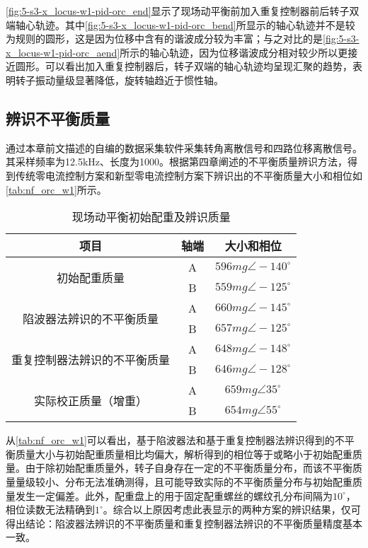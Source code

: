 \documentclass[
  lang=cn,
  degree=master,
  openany,oneside
]{nuaathesis}
\begin{document}
\autoref{fig:5-s3-x_locus-w1-pid-orc_end}显示了现场动平衡前加入重复控制器前后转子双端轴心轨迹。其中\autoref{fig:5-s3-x_locus-w1-pid-orc_bend}所显示的轴心轨迹并不是较为规则的圆形，这是因为位移中含有的谐波成分较为丰富；与之对比的是\autoref{fig:5-s3-x_locus-w1-pid-orc_aend}所示的轴心轨迹，因为位移谐波成分相对较少所以更接近圆形。可以看出加入重复控制器后，转子双端的轴心轨迹均呈现汇聚的趋势，表明转子振动量级显著降低，旋转轴趋近于惯性轴。

\subsection{辨识不平衡质量}

通过本章前文描述的自编的数据采集软件采集转角离散信号和四路位移离散信号。其采样频率为12.5kHz、长度为1000。根据第四章阐述的不平衡质量辨识方法，得到传统零电流控制方案和新型零电流控制方案下辨识出的不平衡质量大小和相位如\autoref{tab:nf_orc_w1}所示。

\begin{table}[h!]
  \caption[现场动平衡初始配重及辨识质量]{现场动平衡初始配重及辨识质量\label{tab:nf_orc_w1}}
\begin{tabular}{ccc}
    \toprule
    	项目  & 轴端 & 大小和相位 \\
    \midrule
		\multirow{2}{*}{初始配重质量}   
		& A  & $596mg \angle -140^{\circ}$      \\
		& B  & $559mg \angle -125^{\circ}$      \\    
		\multirow{2}{*}{陷波器法辨识的不平衡质量}   
		& A  & $660mg \angle -145^{\circ}$      \\
		& B  & $657mg \angle -125^{\circ}$      \\
		\multirow{2}{*}{重复控制器法辨识的不平衡质量} 
		& A  & $648mg \angle -148^{\circ}$      \\
        & B  & $646mg \angle -128^{\circ}$     	\\
		\multirow{2}{*}{实际校正质量（增重）} 
		& A  & $659mg \angle 35^{\circ}$      \\
        & B  & $654mg \angle 55^{\circ}$     	\\        
    \bottomrule
\end{tabular}
\end{table}

从\autoref{tab:nf_orc_w1}可以看出，基于陷波器法和基于重复控制器法辨识得到的不平衡质量大小与初始配重质量相比均偏大，解析得到的相位等于或略小于初始配重质量。由于除初始配重质量外，转子自身存在一定的不平衡质量分布，而该不平衡质量量级较小、分布无法准确测得，且可能导致实际的不平衡质量分布与初始配重质量发生一定偏差。此外，配重盘上的用于固定配重螺丝的螺纹孔分布间隔为$10^{\circ}$，相位读数无法精确到$1^{\circ}$。综合以上原因考虑此表显示的两种方案的辨识结果，仅可得出结论：陷波器法辨识的不平衡质量和重复控制器法辨识的不平衡质量精度基本一致。
\end{document}
